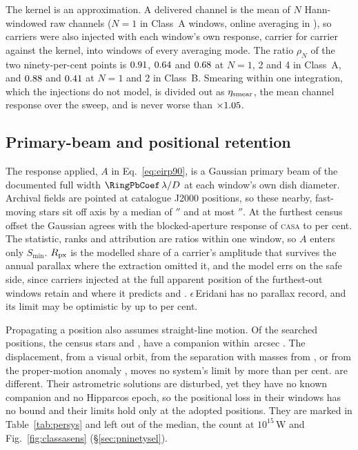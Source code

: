 The kernel is an approximation. A delivered channel is the mean of $N$
Hann-windowed raw channels ($N=1$ in \SvNWinNOne{} Class~A windows, online
averaging in \SvNWinNAvg), so carriers were also injected with each window's
own response, carrier for carrier against the kernel, into \IjNWin{} windows
of every averaging mode. The ratio $\rho_N$ of the two ninety-per-cent points
is $0.91$, $0.64$ and $0.68$ at $N=1$, 2 and 4 in
Class~A, and $0.88$ and $0.41$ at $N=1$ and 2 in Class~B.
Smearing within one integration, which the injections do not model, is
divided out as $\eta_{\rm smear}$, the mean channel response over the sweep,
and is never worse than $\times1.05$.

\subsection{Primary-beam and positional retention}
\label{app:pbresp}

The response applied, $A$ in Eq.~\ref{eq:eirp90}, is a Gaussian primary beam
of the documented full width $\RingPbCoef\,\lambda/D$ \citep{ALMAHandbook}
at each window's own dish diameter. Archival fields are pointed at catalogue
J2000 positions, so these nearby, fast-moving stars sit off axis by a median
of \PbOffMed$''$ and at most \BmOffMax$''$. At the furthest census offset the
Gaussian agrees with the blocked-aperture response of \textsc{casa}
\citep{CASA2022} to \BmCensusWorstPct{} per cent. The statistic, ranks and
attribution are ratios within one window, so $A$ enters only $S_{\min}$.
$R_{\rm px}$ is the modelled share of a carrier's amplitude that survives the
annual parallax where the extraction omitted it, and the model errs on the
safe side, since carriers injected at the full apparent position of the
\SensNReextWin{} furthest-out windows retain \SensPxSmallMeas{} and
\SensPxLargeMeas{} where it predicts \SensPxSmallPred{} and
\SensPxLargePred. $\epsilon$\,Eridani has no parallax record, and its limit
may be optimistic by up to \BmEpsPxBoundPct{} per cent.

Propagating a position also assumes straight-line motion. Of the
\OmNStar{} searched positions, the \OmNCensusStar{} census stars and
\OmXStar, \OmNComponent{} have a companion within
\OmRadius\,arcsec \citep{wds,orb6}. The displacement, from a visual orbit,
from the separation with masses from \citet{pecaut2013}, or from the
proper-motion anomaly \citep{kervella2022}, moves no system's limit by more
than \OmSysMovedMaxPct{} per cent. \OmFlagStars{} are different. Their
astrometric solutions are disturbed, yet they have no known companion and no
Hipparcos epoch, so the positional loss in their \OmNWinFlag{} windows has no
bound and their limits hold only at the adopted positions. They are marked
in Table~\ref{tab:persys} and left out of the median, the count at
$10^{15}$\,W and Fig.~\ref{fig:classasens} (\S\ref{sec:pninetysel}).

